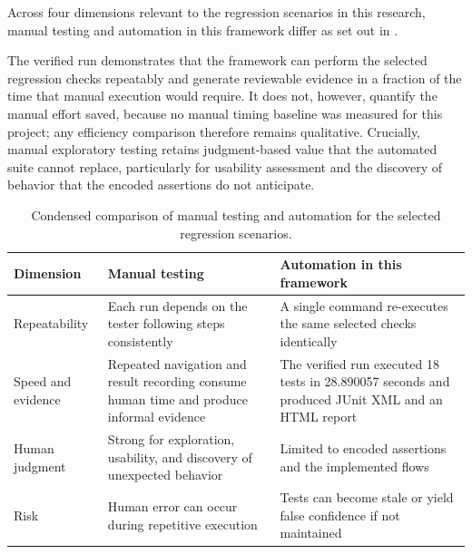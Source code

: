 Across four dimensions relevant to the regression scenarios in this research, manual testing and automation in this framework differ as set out in .

The verified run demonstrates that the framework can perform the selected regression checks repeatably and generate reviewable evidence in a fraction of the time that manual execution would require. It does not, however, quantify the manual effort saved, because no manual timing baseline was measured for this project; any efficiency comparison therefore remains qualitative. Crucially, manual exploratory testing retains judgment-based value that the automated suite cannot replace, particularly for usability assessment and the discovery of behavior that the encoded assertions do not anticipate.

\begin{table}[htbp]
  \centering
  \tablefont
  \begin{tabularx}{\textwidth}{YYY}
    \toprule
    Dimension & Manual testing & Automation in this framework \\
    \midrule
    Repeatability & Each run depends on the tester following steps consistently & A single command re-executes the same selected checks identically \\
    Speed and evidence & Repeated navigation and result recording consume human time and produce informal evidence & The verified run executed 18 tests in 28.890057 seconds and produced JUnit XML and an HTML report \\
    Human judgment & Strong for exploration, usability, and discovery of unexpected behavior & Limited to encoded assertions and the implemented flows \\
    Risk & Human error can occur during repetitive execution & Tests can become stale or yield false confidence if not maintained \\
    \bottomrule
  \end{tabularx}
  \caption{Condensed comparison of manual testing and automation for the selected regression scenarios.}
  \label{tab:ch5-manual-automation-comparison}
\end{table}

\endgroup
